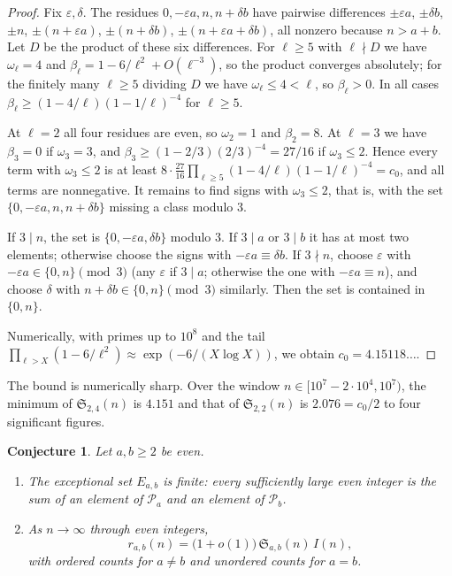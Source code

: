 \documentclass[11pt]{amsart}
\newtheorem{conjecture}[theorem]{Conjecture}
\theoremstyle{definition}
\theoremstyle{remark}
\newcommand{\PP}{\mathcal{P}}
\newcommand{\Sg}{\mathfrak{S}}
\begin{document}
\begin{proof}
Fix $\varepsilon,\delta$. The residues $0,-\varepsilon a,n,n+\delta b$ have pairwise differences $\pm\varepsilon a$, $\pm\delta b$, $\pm n$, $\pm(n+\varepsilon a)$, $\pm(n+\delta b)$, $\pm(n+\varepsilon a+\delta b)$, all nonzero because $n>a+b$. Let $D$ be the product of these six differences. For $\ell\ge5$ with $\ell\nmid D$ we have $\omega_\ell=4$ and $\beta_\ell=1-6/\ell^2+O(\ell^{-3})$, so the product converges absolutely; for the finitely many $\ell\ge5$ dividing $D$ we have $\omega_\ell\le 4<\ell$, so $\beta_\ell>0$. In all cases $\beta_\ell\ge(1-4/\ell)(1-1/\ell)^{-4}$ for $\ell\ge5$.

At $\ell=2$ all four residues are even, so $\omega_2=1$ and $\beta_2=8$. At $\ell=3$ we have $\beta_3=0$ if $\omega_3=3$, and $\beta_3\ge(1-2/3)(2/3)^{-4}=27/16$ if $\omega_3\le2$. Hence every term with $\omega_3\le 2$ is at least $8\cdot\frac{27}{16}\prod_{\ell\ge5}(1-4/\ell)(1-1/\ell)^{-4}=c_0$, and all terms are nonnegative. It remains to find signs with $\omega_3\le2$, that is, with the set $\{0,-\varepsilon a,n,n+\delta b\}$ missing a class modulo $3$.

If $3\mid n$, the set is $\{0,-\varepsilon a,\delta b\}$ modulo $3$. If $3\mid a$ or $3\mid b$ it has at most two elements; otherwise choose the signs with $-\varepsilon a\equiv\delta b$. If $3\nmid n$, choose $\varepsilon$ with $-\varepsilon a\in\{0,n\}\pmod 3$ (any $\varepsilon$ if $3\mid a$; otherwise the one with $-\varepsilon a\equiv n$), and choose $\delta$ with $n+\delta b\in\{0,n\}\pmod 3$ similarly. Then the set is contained in $\{0,n\}$.

Numerically, with primes up to $10^8$ and the tail $\prod_{\ell>X}(1-6/\ell^2)\approx\exp(-6/(X\log X))$, we obtain $c_0=4.15118\ldots$.
\end{proof}

The bound is numerically sharp. Over the window $n\in[10^7-2\cdot10^4,10^7)$, the minimum of $\Sg_{2,4}(n)$ is $4.151$ and that of $\Sg_{2,2}(n)$ is $2.076=c_0/2$ to four significant figures.

\begin{conjecture}\label{conj:main}
Let $a,b\ge2$ be even.
\begin{enumerate}
\item The exceptional set $E_{a,b}$ is finite: every sufficiently large even integer is the sum of an element of $\PP_a$ and an element of $\PP_b$.
\item As $n\to\infty$ through even integers,
\[
r_{a,b}(n)=\bigl(1+o(1)\bigr)\,\Sg_{a,b}(n)\,I(n),
\]
with ordered counts for $a\ne b$ and unordered counts for $a=b$.
\end{enumerate}
\end{conjecture}
\end{document}
